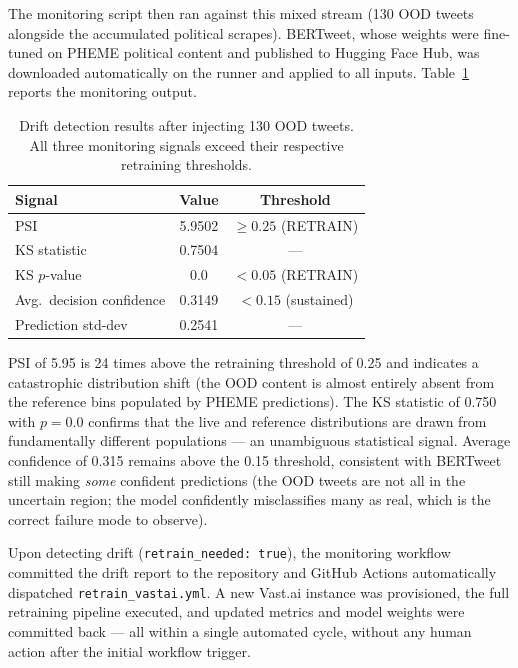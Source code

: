 \documentclass[sigconf]{acmart}
\begin{document}
The monitoring script then ran against this mixed stream (130 OOD tweets alongside the
accumulated political scrapes). BERTweet, whose weights were fine-tuned on PHEME political
content and published to Hugging Face Hub, was downloaded automatically on the runner and
applied to all inputs. Table~\ref{tab:drift} reports the monitoring output.

\begin{table}[h]
\centering
\caption{Drift detection results after injecting 130 OOD tweets. All three monitoring
         signals exceed their respective retraining thresholds.}
\label{tab:drift}
\begin{tabular}{lcc}
\toprule
\textbf{Signal} & \textbf{Value} & \textbf{Threshold} \\
\midrule
PSI                         & 5.9502         & $\geq 0.25$ (RETRAIN) \\
KS statistic                & 0.7504         & ---                   \\
KS $p$-value                & $0.0$          & $< 0.05$ (RETRAIN)    \\
Avg.\ decision confidence   & 0.3149         & $< 0.15$ (sustained)  \\
Prediction std-dev          & 0.2541         & ---                   \\
\bottomrule
\end{tabular}
\end{table}

PSI of 5.95 is 24 times above the retraining threshold of 0.25 and indicates a catastrophic
distribution shift (the OOD content is almost entirely absent from the reference bins
populated by PHEME predictions). The KS statistic of 0.750 with $p = 0.0$ confirms that
the live and reference distributions are drawn from fundamentally different populations —
an unambiguous statistical signal. Average confidence of 0.315 remains above the 0.15
threshold, consistent with BERTweet still making \textit{some} confident predictions
(the OOD tweets are not all in the uncertain region; the model confidently misclassifies
many as real, which is the correct failure mode to observe).

Upon detecting drift (\texttt{retrain\_needed: true}), the monitoring workflow committed
the drift report to the repository and GitHub Actions automatically dispatched
\texttt{retrain\_vastai.yml}. A new Vast.ai instance was provisioned, the full retraining
pipeline executed, and updated metrics and model weights were committed back — all within
a single automated cycle, without any human action after the initial workflow trigger.
\end{document}
